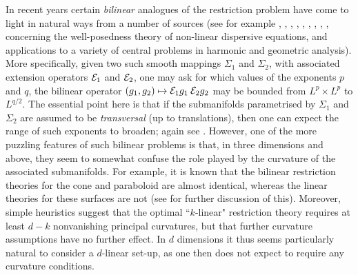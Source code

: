 In recent years certain \textit{bilinear} analogues of the
restriction problem have come to light in natural ways from a
number of sources (see for example \cite{Bolattice},
\cite{KM}, \cite{MVV},
\cite{TVV}, \cite{wolffcone}, \cite{Taocone}, \cite{TaoKM}, \cite{vargas},
\cite{Lee},
\cite{Erd} concerning the
well-posedness theory of non-linear dispersive
equations, and applications to a variety of central problems in harmonic and
geometric analysis). More
specifically, given two such smooth mappings $\Sigma_{1}$ and
$\Sigma_{2}$, with associated extension operators ${\mathcal{E}}_{1}$ and
${\mathcal{E}}_{2}$, one may ask for which values of the exponents $p$ and
$q$, the bilinear operator
$(g_{1},g_{2})\mapsto{\mathcal{E}}_{1}g_{1}\:{\mathcal{E}}_{2}g_{2}$ may be bounded
from $L^{p}\times L^{p}$ to $L^{q/2}$. The essential point here is
that if the submanifolds parametrised by $\Sigma_{1}$ and
$\Sigma_{2}$ are assumed to be \textit{transversal} (up to
translations), then one can expect the range of such exponents to
broaden; again see \cite{TVV}. However, one of the more puzzling
features of such bilinear problems is that, in three dimensions
and above, they seem to somewhat confuse the role played by the
curvature of the associated submanifolds. For example, it is known
that the bilinear restriction theories for the cone and paraboloid
are almost identical, whereas the linear theories for these surfaces
are not (see \cite{TaoRestn} for further discussion of this).
Moreover, simple heuristics suggest that the optimal ``$k$-linear"
restriction theory requires at least $d-k$ nonvanishing principal
curvatures, but that further curvature assumptions have no further effect.
In $d$ dimensions it thus seems particularly natural
to consider a $d$-linear set-up, as one then does not expect to require any curvature conditions.

